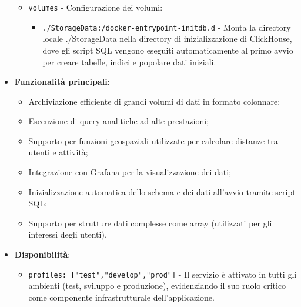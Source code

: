 \documentclass[10pt]{article}
\begin{document}
\begin{itemize}
\begin{itemize}
\begin{itemize}
            \end{itemize}
            \item \texttt{volumes} - Configurazione dei volumi:
            \begin{itemize}
                \item \texttt{./StorageData:/docker-entrypoint-initdb.d} - Monta la directory locale ./StorageData nella directory di inizializzazione di ClickHouse, dove gli script SQL vengono eseguiti automaticamente al primo avvio per creare tabelle, indici e popolare dati iniziali.
            \end{itemize}
        \end{itemize}
        
        \item \textbf{Funzionalità principali}:
        \begin{itemize}
            \item Archiviazione efficiente di grandi volumi di dati in formato colonnare;
            \item Esecuzione di query analitiche ad alte prestazioni;
            \item Supporto per funzioni geospaziali utilizzate per calcolare distanze tra utenti e attività;
            \item Integrazione con Grafana per la visualizzazione dei dati;
            \item Inizializzazione automatica dello schema e dei dati all'avvio tramite script SQL;
            \item Supporto per strutture dati complesse come array (utilizzati per gli interessi degli utenti).
        \end{itemize}
        
        \item \textbf{Disponibilità}:
        \begin{itemize}
            \item \texttt{profiles: ["test","develop","prod"]} - Il servizio è attivato in tutti gli ambienti (test, sviluppo e produzione), evidenziando il suo ruolo critico come componente infrastrutturale dell'applicazione.
        \end{itemize}
        \end{itemize}
        
\end{document}
